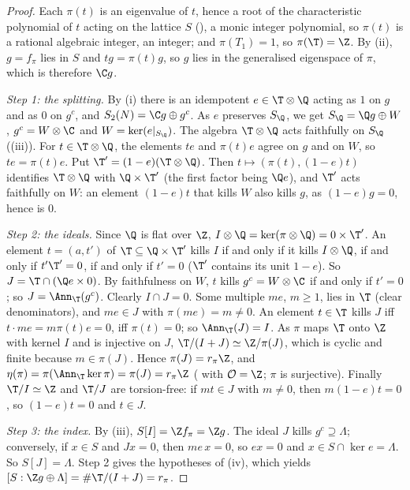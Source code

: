 \begin{proof}
Each $\pi(t)$ is an eigenvalue of $t$, hence a root of the characteristic polynomial of $t$ acting on the lattice $S$ (), a monic integer polynomial, so $\pi(t)$ is a rational
algebraic integer, an integer; and $\pi(T_1)=1$, so $\pi(\T)=\Z$. By (ii), $g=f_\pi$ lies in $S$ and $tg=\pi(t)g$, so $g$ lies in the generalised eigenspace of $\pi$,
which is therefore $\C g$.

\emph{Step 1: the splitting.} By (i) there is an idempotent $e\in\T\otimes\Q$ acting as $1$ on $g$ and as $0$ on $g^c$, and $S_2(N)=\C g\oplus g^c$. As $e$ preserves
$S_\Q$, we get $S_\Q=\Q g\oplus W$, $g^c=W\otimes\C$ and $W=\ker(e|_{S_\Q})$. The algebra $\T\otimes\Q$ acts faithfully on $S_\Q$ ((iii)). For $t\in\T\otimes\Q$, the
elements $te$ and $\pi(t)e$ agree on $g$ and on $W$, so $te=\pi(t)e$. Put $\T'=(1-e)(\T\otimes\Q)$. Then $t\mapsto(\pi(t),(1-e)t)$ identifies $\T\otimes\Q$ with $\Q\times\T'$ (the first factor
being $\Q e$), and $\T'$ acts faithfully on $W$: an element $(1-e)t$ that kills $W$ also kills $g$, as $(1-e)g=0$, hence is $0$.

\emph{Step 2: the ideals.} Since $\Q$ is flat over $\Z$, $I\otimes\Q=\ker(\pi\otimes\Q)=0\times\T'$. An element $t=(a,t')$ of $\T\subseteq\Q\times\T'$ kills $I$ if and only if it kills $I\otimes\Q$, if and
only if $t'\T'=0$, if and only if $t'=0$ ($\T'$ contains its unit $1-e$). So $J=\T\cap(\Q e\times0)$. By faithfulness on $W$, $t$ kills $g^c=W\otimes\C$ if and only if $t'=0$; so $J=\Ann_\T(g^c)$.
Clearly $I\cap J=0$. Some multiple $me$, $m\ge1$, lies in $\T$ (clear denominators), and $me\in J$ with $\pi(me)=m\ne0$. An element $t\in\T$ kills $J$ iff $t\cdot me=m\pi(t)e=0$, iff $\pi(t)=0$; so
$\Ann_\T(J)=I$. As $\pi$ maps $\T$ onto $\Z$ with kernel $I$ and is injective on $J$, $\T/(I+J)\simeq\Z/\pi(J)$, which is cyclic and finite because $m\in\pi(J)$. Hence $\pi(J)=r_\pi\Z$, and
$\eta(\pi)=\pi(\Ann_\T\ker\pi)=\pi(J)=r_\pi\Z$ ( with $\mathcal O=\Z$; $\pi$ is surjective). Finally $\T/I\simeq\Z$ and $\T/J$ are torsion-free: if $mt\in J$ with $m\ne0$,
then $m(1-e)t=0$, so $(1-e)t=0$ and $t\in J$.

\emph{Step 3: the index.} By (iii), $S[I]=\Z f_\pi=\Z g$. The ideal $J$ kills $g^c\supseteq\Lambda$; conversely, if $x\in S$ and $Jx=0$, then $me\,x=0$, so $ex=0$ and
$x\in S\cap\ker e=\Lambda$. So $S[J]=\Lambda$. Step 2 gives the hypotheses of (iv), which yields $[S:\Z g\oplus\Lambda]=\#\T/(I+J)=r_\pi$.


\end{proof}
